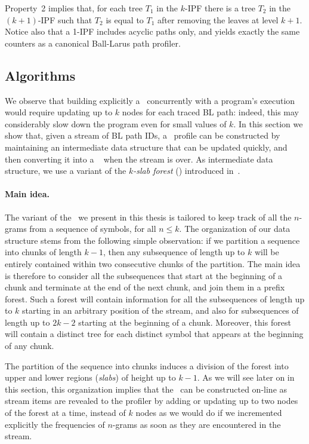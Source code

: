 Property~2 implies that, for each tree $T_1$ in the $k$-IPF there is a tree $T_2$ in the $(k+1)$-IPF such that $T_2$ is equal to $T_1$ after removing the leaves at level $k+1$.
Notice also that a 1-IPF includes acyclic paths only, and yields exactly the same counters as a canonical Ball-Larus path profiler. %


\subsection{Algorithms}
\label{ss:kblp-algorithms}

We observe that building explicitly a \kipf\ concurrently with a program's execution would require updating up to $k$ nodes for each traced BL path: indeed, this may considerably slow down the program even for small values of $k$. In this section we show that, given a stream of BL path IDs, a \kipf\ profile can be constructed by maintaining an intermediate data structure that can be updated quickly, and then converting it into a \kipf\
when the stream is over. As intermediate data structure, we use a variant of the {\em $k$-slab forest} (\ksf) introduced in~\cite{Ausiello12}.

\paragraph*{Main idea.} The variant of the \ksf\ we present in this thesis is tailored to keep track of all the $n$-grams from a sequence of symbols, for all $n\le k$. The organization of our data structure stems from the following simple observation: if we partition a sequence into chunks of length $k-1$, then any subsequence of length up to $k$ will be entirely contained within two consecutive chunks of the partition. The main idea is therefore to consider all the subsequences that start at the beginning of a chunk and terminate at the end of the next chunk, and join them in a prefix forest. Such a forest will contain information for all the subsequences of length up to $k$ starting in an arbitrary position of the stream, and also for subsequences of length up to $2k-2$ starting at the beginning of a chunk. Moreover, this forest will contain a distinct tree for each distinct symbol that appears at the beginning of any chunk.

The partition of the sequence into chunks induces a division of the forest into upper and lower regions ({\em slabs}) of height up to $k-1$. As we will see later on in this section, this organization implies that the \ksf\ can be constructed on-line as stream items are revealed to the profiler by adding or updating up to two nodes of the forest at a time, instead of $k$ nodes as we would do if we incremented explicitly the frequencies of $n$-grams as soon as they are encountered in the stream.

